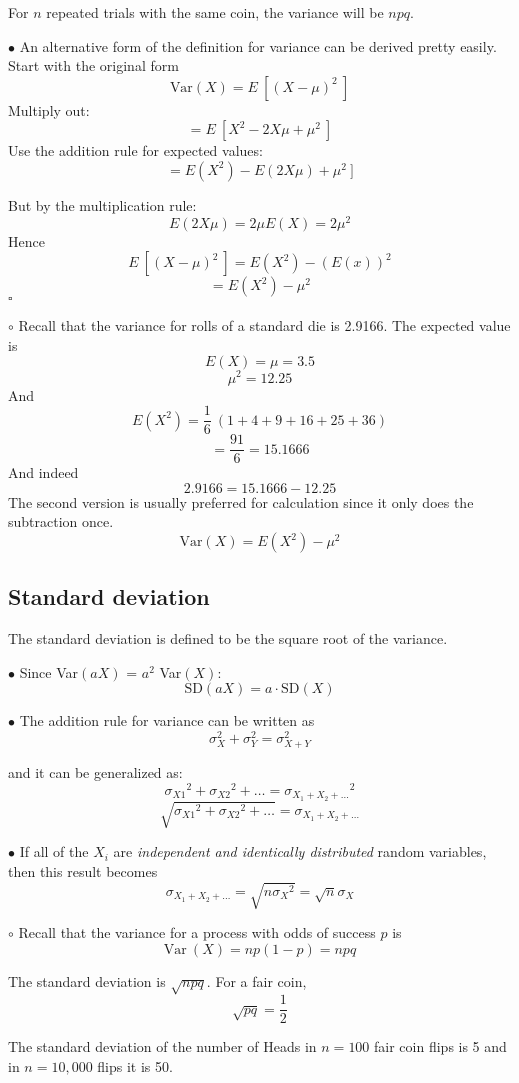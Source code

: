 \documentclass[11pt, oneside]{article}
\begin{document}
For $n$ repeated trials with the same coin, the variance will be $npq$.

$\bullet$ An alternative form of the definition for variance can be derived pretty easily.  Start with the original form
\[ \text{Var}(X) = E \ [ (X - \mu)^2 \ ] \]
Multiply out:
\[ = E \ [ X^2 - 2 X \mu + \mu^2 \ ] \]
Use the addition rule for expected values:
\[ = E(X^2) - E(2 X \mu) + \mu^2 \ ] \]

But by the multiplication rule:
\[ E(2 X \mu) = 2 \mu E(X) = 2 \mu^2 \]
Hence
\[ E \ [ (X - \mu)^2 \ ] = E(X^2) - (E(x))^2 \]
\[ =  E(X^2) - \mu^2 \]
$\square$

$\circ$ Recall that the variance for rolls of a standard die is 2.9166.  The expected value is
\[ E(X) = \mu = 3.5 \]
\[ \mu^2 = 12.25 \]
And
\[ E(X^2) = \frac{1}{6} \ (1 + 4 + 9 + 16 + 25 + 36) \]
\[ = \frac{91}{6} = 15.1666 \]
And indeed
\[ 2.9166 = 15.1666 - 12.25 \]
The second version is usually preferred for calculation since it only does the subtraction once.
\[ \text{Var}(X) = E(X^2) - \mu^2 \]

\subsection*{Standard deviation}
The standard deviation is defined to be the square root of the variance.

$\bullet$ Since Var$(aX)$ = $a^2$ Var$(X)$:
\[  \text{SD}(aX) = a \cdot \text{SD}(X) \]

$\bullet$ The addition rule for variance can be written as
\[ \sigma_X^2 + \sigma_Y^2 = \sigma_{X+Y}^2\]

and it can be generalized as:
\[ {\sigma_{X1}}^2 + {\sigma_{X2}}^2 + \dots = {\sigma_{X_1 + X_2 + \dots}}^2 \]
\[ \sqrt{{\sigma_{X1}}^2 + {\sigma_{X2}}^2 + \dots} = \sigma_{X_1 + X_2 + \dots} \]

$\bullet$ If all of the $X_i$ are \emph{independent and identically distributed} random variables, then this result becomes
\[ \sigma_{X_1 + X_2 + \dots} = \sqrt{n {\sigma_{X}}^2} = \sqrt{n} \sigma_{X}  \]

$\circ$ Recall that the variance for a process with odds of success $p$ is
\[ \text{Var} \ (X) = np(1-p) = npq \]

The standard deviation is $\sqrt{npq}$.  For a fair coin, 
\[ \sqrt{pq} = \frac{1}{2} \]

The standard deviation of the number of Heads in $n = 100$ fair coin flips is 5 and in $n=10,000$ flips it is 50.
\end{document}
